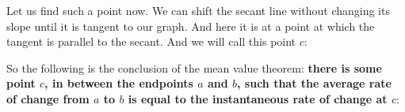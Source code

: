 \documentclass[pdftex, brazil, 12pt, twoside]{article}
\begin{document}
Let us find such a point now.
We can shift the secant line without changing its slope
until it is tangent to our graph.
And here it is at a point at which the tangent is parallel
to the secant.
And we will call this point $c$:

\begin{figure}[H]
  \begin{center}
    \label{fig:mvt-avgxinst-9}
  \end{center}
\end{figure}

So the following is the conclusion
of the mean value theorem:
\textbf{there is some point $c$, in between the endpoints $a$
and $b$, such that the average rate of change from $a$ to $b$
is equal to the instantaneous rate of change at $c$}:

\begin{figure}[H]
  \begin{center}
    \label{fig:mvt-avgxinst-10}
  \end{center}
\end{figure}
\end{document}
